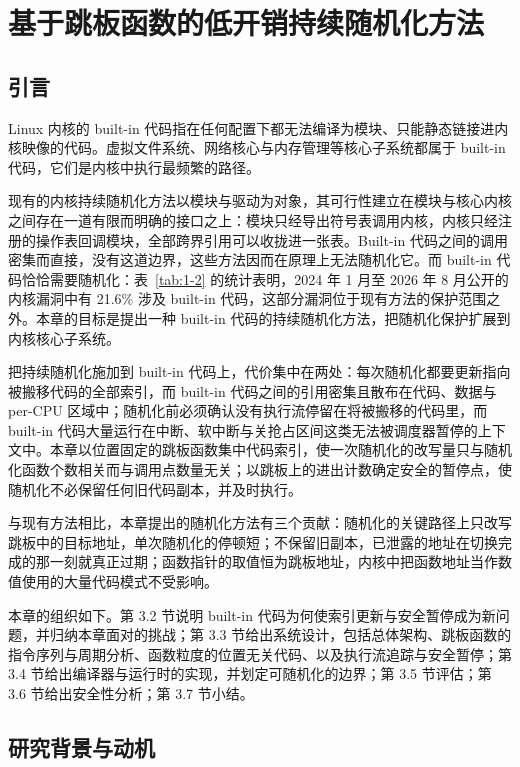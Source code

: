 \chapter{基于跳板函数的低开销持续随机化方法}
\label{chap:3}

\section{引言}

Linux 内核的 built-in 代码指在任何配置下都无法编译为模块、只能静态链接进内核映像的代码。虚拟文件系统、网络核心与内存管理等核心子系统都属于 built-in 代码，它们是内核中执行最频繁的路径。

现有的内核持续随机化方法以模块与驱动为对象，其可行性建立在模块与核心内核之间存在一道有限而明确的接口之上：模块只经导出符号表调用内核，内核只经注册的操作表回调模块，全部跨界引用可以收拢进一张表。Built-in 代码之间的调用密集而直接，没有这道边界，这些方法因而在原理上无法随机化它。而 built-in 代码恰恰需要随机化：表~\ref{tab:1-2} 的统计表明，2024 年 1 月至 2026 年 8 月公开的内核漏洞中有 21.6\% 涉及 built-in 代码，这部分漏洞位于现有方法的保护范围之外。本章的目标是提出一种 built-in 代码的持续随机化方法，把随机化保护扩展到内核核心子系统。

把持续随机化施加到 built-in 代码上，代价集中在两处：每次随机化都要更新指向被搬移代码的全部索引，而 built-in 代码之间的引用密集且散布在代码、数据与 per-CPU 区域中；随机化前必须确认没有执行流停留在将被搬移的代码里，而 built-in 代码大量运行在中断、软中断与关抢占区间这类无法被调度器暂停的上下文中。本章以位置固定的跳板函数集中代码索引，使一次随机化的改写量只与随机化函数个数相关而与调用点数量无关；以跳板上的进出计数确定安全的暂停点，使随机化不必保留任何旧代码副本，并及时执行。

与现有方法相比，本章提出的随机化方法有三个贡献：随机化的关键路径上只改写跳板中的目标地址，单次随机化的停顿短；不保留旧副本，已泄露的地址在切换完成的那一刻就真正过期；函数指针的取值恒为跳板地址，内核中把函数地址当作数值使用的大量代码模式不受影响。

本章的组织如下。第 3.2 节说明 built-in 代码为何使索引更新与安全暂停成为新问题，并归纳本章面对的挑战；第 3.3 节给出系统设计，包括总体架构、跳板函数的指令序列与周期分析、函数粒度的位置无关代码、以及执行流追踪与安全暂停；第 3.4 节给出编译器与运行时的实现，并划定可随机化的边界；第 3.5 节评估；第 3.6 节给出安全性分析；第 3.7 节小结。

\section{研究背景与动机}

